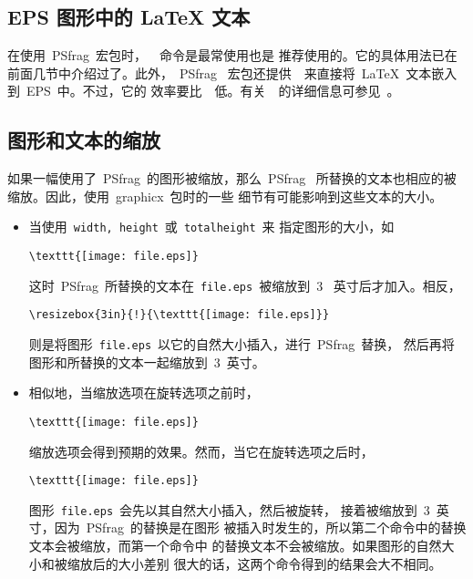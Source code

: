 \subsection{EPS 图形中的 \LaTeX{} 文本}\label{ssec:latextext}

在使用~\textsf{PSfrag}~宏包时，~~命令是最常使用也是
推荐使用的。它的具体用法已在前面几节中介绍过了。此外，~\textsf{PSfrag}~
宏包还提供~~来直接将~\LaTeX{}~文本嵌入到~EPS~中。不过，它的
效率要比~~低。有关~~的详细信息可参见~\cite{psfrag}。

\subsection{图形和文本的缩放}\label{ssec:psfragscale}

如果一幅使用了~\textsf{PSfrag}~的图形被缩放，那么~\textsf{PSfrag}~
所替换的文本也相应的被缩放。因此，使用~\textsf{graphicx}~包时的一些
细节有可能影响到这些文本的大小。

\begin{itemize}
\item 当使用~\texttt{width, height}~或~\texttt{totalheight}~来
      指定图形的大小，如
      \begin{Verbatim}[xleftmargin=1cm]
      \texttt{[image: file.eps]}
      \end{Verbatim}
      这时~\textsf{PSfrag}~所替换的文本在~\texttt{file.eps}~被缩放到~3~
      英寸后才加入。相反，
      \begin{Verbatim}[xleftmargin=1cm]
      \resizebox{3in}{!}{\texttt{[image: file.eps]}}
      \end{Verbatim}
      则是将图形~\texttt{file.eps}~以它的自然大小插入，进行~\textsf{PSfrag}~替换，
      然后再将图形和所替换的文本一起缩放到~3~英寸。
\item 相似地，当缩放选项在旋转选项之前时，
      \begin{Verbatim}[xleftmargin=1cm]
      \texttt{[image: file.eps]}
      \end{Verbatim}
      缩放选项会得到预期的效果。然而，当它在旋转选项之后时，
      \begin{Verbatim}[xleftmargin=1cm]
      \texttt{[image: file.eps]}
      \end{Verbatim}
      图形~\texttt{file.eps}~会先以其自然大小插入，然后被旋转，
      接着被缩放到~3~英寸，因为~\textsf{PSfrag}~的替换是在图形
      被插入时发生的，所以第二个命令中的替换文本会被缩放，而第一个命令中
      的替换文本不会被缩放。如果图形的自然大小和被缩放后的大小差别
      很大的话，这两个命令得到的结果会大不相同。
\end{itemize}

